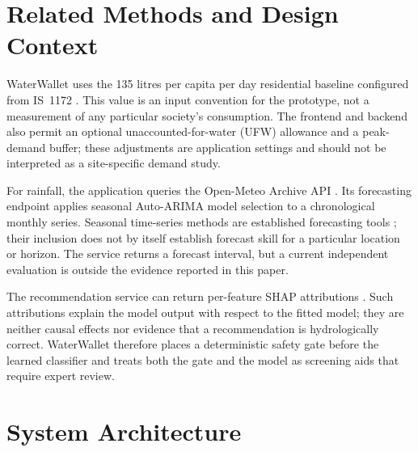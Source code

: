 \documentclass[conference]{IEEEtran}
\begin{document}
\section{Related Methods and Design Context}
\label{sec:related}

WaterWallet uses the 135 litres per capita per day residential baseline
configured from IS~1172 \cite{bis1172}. This value is an input convention
for the prototype, not a measurement of any particular society's
consumption. The frontend and backend also permit an optional
unaccounted-for-water (UFW) allowance and a peak-demand buffer; these
adjustments are application settings and should not be interpreted as a
site-specific demand study.

For rainfall, the application queries the Open-Meteo Archive API
\cite{openmeteo}. Its forecasting endpoint applies seasonal Auto-ARIMA
model selection to a chronological monthly series. Seasonal time-series
methods are established forecasting tools \cite{hyndman}; their inclusion
does not by itself establish forecast skill for a particular location or
horizon. The service returns a forecast interval, but a current
independent evaluation is outside the evidence reported in this paper.

The recommendation service can return per-feature SHAP attributions
\cite{lundberg}. Such attributions explain the model output with respect
to the fitted model; they are neither causal effects nor evidence that a
recommendation is hydrologically correct. WaterWallet therefore places a
deterministic safety gate before the learned classifier and treats both
the gate and the model as screening aids that require expert review.

\section{System Architecture}
\label{sec:architecture}
\end{document}
